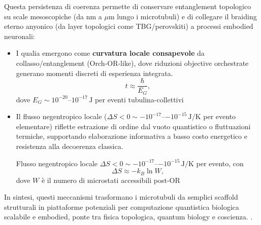 \documentclass[11pt,a4paper]{article}
\let\oldcite\cite
\renewcommand{\cite}{\protect\oldcite}
\theoremstyle{plain}
\theoremstyle{definition}
\begin{document}
Questa persistenza di coerenza permette di conservare entanglement topologico su scale mesoscopiche (da nm a $\mu$m lungo i microtubuli) e di collegare il braiding eterno anyonico (da layer topologici come TBG/perovskiti) a processi embodied neuronali:
\begin{itemize}
    \item I qualia emergono come \textbf{curvatura locale consapevole} da collasso/entanglement (Orch-OR-like), dove riduzioni objective orchestrate generano momenti discreti di esperienza integrata.   
    \begin{equation}
    t \approx \frac{\hbar}{E_G},
    \label{eq:orchestrated_reduction_time}
    \end{equation}
    dove $E_G \sim 10^{-20}$--$10^{-17}\,\mathrm{J}$ per eventi tubulina-collettivi 
    \item Il flusso negentropico locale ($\Delta S < 0 \sim -10^{-17}$--$-10^{-15}\,\mathrm{J/K}$ per evento elementare) riflette estrazione di ordine dal vuoto quantistico o fluttuazioni termiche, supportando elaborazione informativa a basso costo energetico e resistenza alla decoerenza classica.

    \vspace{0.3cm}
    Flusso negentropico locale $\Delta S < 0 \sim -10^{-17}$--$-10^{-15}\,\mathrm{J/K}$ per evento, con
    \begin{equation}
    \Delta S \approx -k_B \ln W,
    \label{eq:negentropic_flow}
    \end{equation}
    dove $W$ è il numero di microstati accessibili post-OR
\end{itemize}

In sintesi, questi meccanismi trasformano i microtubuli da semplici scaffold strutturali in piattaforme potenziali per computazione quantistica biologica scalabile e embodied, ponte tra fisica topologica, quantum biology e coscienza. \cite{hameroff2014orchor, mavromatos2025microtubules, chen2025universal, kurian2025tryptophan}.











\vspace{0.7cm}
\end{document}
